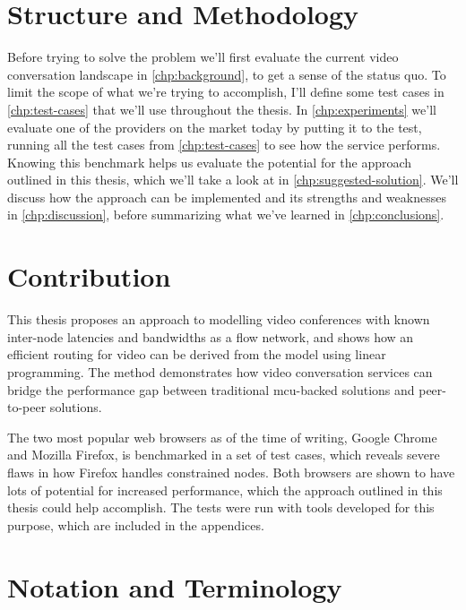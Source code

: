 \section{Structure and Methodology}

Before trying to solve the problem we'll first evaluate the current video conversation landscape in \autoref{chp:background}, to get a sense of the status quo. To limit the scope of what we're trying to accomplish, I'll define some test cases in \autoref{chp:test-cases} that we'll use throughout the thesis. In \autoref{chp:experiments} we'll evaluate one of the providers on the market today by putting it to the test, running all the test cases from \autoref{chp:test-cases} to see how the service performs. Knowing this benchmark helps us evaluate the potential for the approach outlined in this thesis, which we'll take a look at in \autoref{chp:suggested-solution}. We'll discuss how the approach can be implemented and its strengths and weaknesses in \autoref{chp:discussion}, before summarizing what we've learned in \autoref{chp:conclusions}.


\section{Contribution}

This thesis proposes an approach to modelling video conferences with known inter-node latencies and bandwidths as a flow network, and shows how an efficient routing for video can be derived from the model using linear programming. The method demonstrates how video conversation services can bridge the performance gap between traditional \gls{mcu}-backed solutions and peer-to-peer solutions.

The two most popular web browsers as of the time of writing, Google Chrome and Mozilla Firefox, is benchmarked in a set of test cases, which reveals severe flaws in how Firefox handles constrained nodes. Both browsers are shown to have lots of potential for increased performance, which the approach outlined in this thesis could help accomplish. The tests were run with tools developed for this purpose, which are included in the appendices.


\section{Notation and Terminology}

